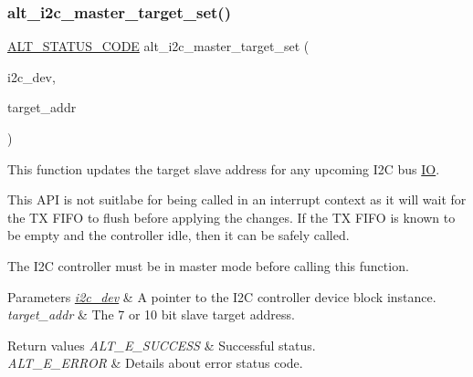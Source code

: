 \subsubsection{\texorpdfstring{alt\_i2c\_master\_target\_set()}{alt\_i2c\_master\_target\_set()}}
{\footnotesize\ttfamily \mbox{\hyperlink{hwlib_8h_abdb0d369f069723ca55d6c94bcaaaa12}{A\+L\+T\+\_\+\+S\+T\+A\+T\+U\+S\+\_\+\+C\+O\+DE}} alt\+\_\+i2c\+\_\+master\+\_\+target\+\_\+set (\begin{DoxyParamCaption}\item[{\mbox{\hyperlink{structALT__I2C__DEV__s}{A\+L\+T\+\_\+\+I2\+C\+\_\+\+D\+E\+V\+\_\+t}} $\ast$}]{i2c\+\_\+dev,  }\item[{uint32\+\_\+t}]{target\+\_\+addr }\end{DoxyParamCaption})}

This function updates the target slave address for any upcoming I2C bus \mbox{\hyperlink{structIO}{IO}}.

This A\+PI is not suitlabe for being called in an interrupt context as it will wait for the TX F\+I\+FO to flush before applying the changes. If the TX F\+I\+FO is known to be empty and the controller idle, then it can be safely called.

The I2C controller must be in master mode before calling this function.


\begin{DoxyParams}{Parameters}
{\em \mbox{\hyperlink{structi2c__dev}{i2c\+\_\+dev}}} & A pointer to the I2C controller device block instance.\\
\hline
{\em target\+\_\+addr} & The 7 or 10 bit slave target address.\\
\hline
\end{DoxyParams}

\begin{DoxyRetVals}{Return values}
{\em A\+L\+T\+\_\+\+E\+\_\+\+S\+U\+C\+C\+E\+SS} & Successful status. \\
\hline
{\em A\+L\+T\+\_\+\+E\+\_\+\+E\+R\+R\+OR} & Details about error status code. \\
\hline
\end{DoxyRetVals}
\mbox{\label{group__ALT__I2C_ga1dcffc4f158e9b5c4ddab03f75e1a393}} 
